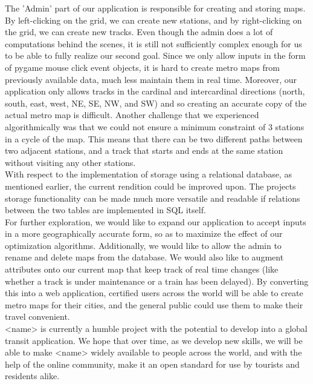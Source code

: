 \documentclass[fontsize=11pt]{article}
\begin{document}
    The 'Admin' part of our application is responsible for creating and storing maps. By left-clicking on the grid, we can create new stations, and by right-clicking on the grid, we can create new tracks. Even though the admin does a lot of computations behind the scenes, it is still not sufficiently complex enough for us to be able to fully realize our second goal. Since we only allow inputs in the form of pygame mouse click event objects, it is hard to create metro maps from previously available data, much less maintain them in real time. Moreover, our application only allows tracks in the cardinal and intercardinal directions (north, south, east, west, NE, SE, NW, and SW) and so creating an accurate copy of the actual metro map is difficult. Another challenge that we experienced algorithmically was that we could not ensure a minimum constraint of 3 stations in a cycle of the map. This means that there can be two different paths between two adjacent stations, and a track that starts and ends at the same station without visiting any other stations. \\

    With respect to the implementation of storage using a relational database, as mentioned earlier, the current rendition could be improved upon. The projects storage functionality can be made much more versatile and readable if relations between the two tables are implemented in SQL itself. \\

    For further exploration, we would like to expand our application to accept inputs in a more geographically accurate form, so as to maximize the effect of our optimization algorithms. Additionally, we would like to allow the admin to rename and delete maps from the database. We would also like to augment attributes onto our current map that keep track of real time changes (like whether a track is under maintenance or a train has been delayed). By converting this into a web application, certified users across the world will be able to create metro maps for their cities, and the general public could use them to make their travel convenient. \\

    <name> is currently a humble project with the potential to develop into a global transit application. We hope that over time, as we develop new skills, we will be able to make <name> widely available to people across the world, and with the help of the online community, make it an open standard for use by tourists and residents alike.
\end{document}

